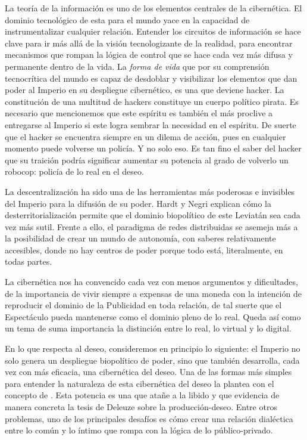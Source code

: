 La teoría de la información es uno de los elementos centrales de la cibernética. El dominio tecnológico de esta para el mundo yace en la capacidad de instrumentalizar cualquier relación. Entender los circuitos de información se hace clave para ir más allá de la visión tecnologizante de la realidad, para encontrar mecanismos que rompan la lógica de control que se hace cada vez más difusa y permanente dentro de la vida. La \emph{forma de vida} que por su comprensión tecnocrítica del mundo es capaz de desdoblar y visibilizar los elementos que dan poder al Imperio en su despliegue cibernético, es una que deviene hacker. La constitución de una multitud de hackers constituye un cuerpo político pirata. Es necesario que mencionemos que este espíritu es también el más proclive a entregarse al Imperio si este logra sembrar la necesidad en el espíritu. De suerte que el hacker se encuentra siempre en un dilema de acción, pues en cualquier momento puede volverse un policía. Y no solo eso. Es tan fino el saber del hacker que su traición podría significar aumentar su potencia al grado de volverlo un robocop: policía de lo real en el deseo.

La descentralización ha sido una de las herramientas más poderosas e invisibles del Imperio para la difusión de su poder. Hardt y Negri explican cómo la desterritorialización permite que el dominio biopolítico de este Leviatán sea cada vez más sutil. Frente a ello, el paradigma de redes distribuidas se asemeja más a la posibilidad de crear un mundo de autonomía, con saberes relativamente accesibles, donde no hay centros de poder porque todo está, literalmente, en todas partes.

La cibernética nos ha convencido cada vez con menos argumentos y dificultades, de la importancia de vivir siempre a expensas de una moneda con la intención de reproducir el dominio de la Publicidad en toda relación, de tal suerte que el Espectáculo pueda mantenerse como el dominio pleno de lo real. Queda así como un tema de suma importancia la distinción entre lo real, lo virtual y lo digital.

En lo que respecta al deseo, consideremos en principio lo siguiente: el Imperio no solo genera un despliegue biopolítico de poder, sino que también desarrolla, cada vez con más eficacia, una cibernética del deseo. Una de las formas más simples para entender la naturaleza de esta cibernética del deseo la plantea \autocite{preciadoTestoYonqui2008} con el concepto de . Esta potencia es una que atañe a la libido y que evidencia de manera concreta la tesis de Deleuze sobre la producción-deseo. Entre otros problemas, uno de los principales desafíos es cómo crear una relación dialéctica entre lo común y lo íntimo que rompa con la lógica de lo público-privado.

